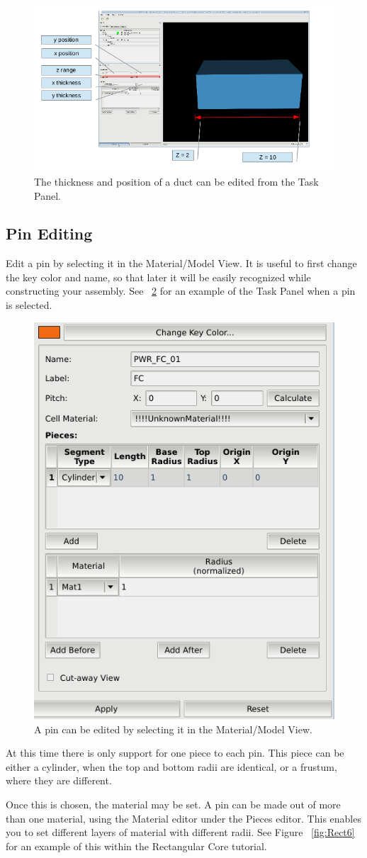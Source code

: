 \begin{figure}
\begin{center}
\includegraphics[width=0.6\linewidth]{Images/duct-editing-labeled.png}
\caption{The thickness and position of a duct can be edited from the Task Panel.}
\label{fig:ductedit1}
\end{center}
\end{figure}

\subsection{Pin Editing}
Edit a pin by selecting it in the Material/Model View.  It is useful to first change the key color and name, so that later it will be easily recognized while constructing your assembly.  See ~\ref{fig:pinedit1} for an example of the Task Panel when a pin is selected.

\begin{figure}
\begin{center}
\includegraphics[width=0.6\linewidth]{Images/pin-editing.png}
\caption{A pin can be edited by selecting it in the Material/Model View.}
\label{fig:pinedit1}
\end{center}
\end{figure}


At this time there is only support for one piece to each pin.  This piece can be either a cylinder, when the top and bottom radii are identical, or a frustum, where they are different.

Once this is chosen, the material may be set.  A pin can be made out of more than one material, using the Material editor under the Pieces editor.  This enables you to set different layers of material with different radii.  See Figure ~\ref{fig:Rect6} for an example of this within the Rectangular Core tutorial.